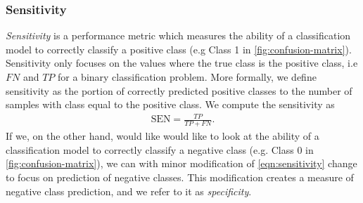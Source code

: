 \subsubsection{Sensitivity}
\label{sec:sensitivity}
\textit{Sensitivity} is a performance metric which measures the ability of a classification model to correctly classify a positive class (e.g Class 1 in \cref{fig:confusion-matrix}). Sensitivity only focuses on the values where the true class is the positive class, i.e $FN$ and $TP$ for a binary classification problem. More formally, we define sensitivity as the portion of correctly predicted positive classes to the number of samples with class equal to the positive class. We compute the sensitivity as
\begin{align}
    \text{SEN} = \frac{TP}{TP + FN}.
    \label{eqn:sensitivity}
\end{align}
If we, on the other hand, would like would like to look at the ability of a classification model to correctly classify a negative class (e.g. Class 0 in \cref{fig:confusion-matrix}), we can with minor modification of \cref{eqn:sensitivity} change to focus on prediction of negative classes. This modification creates a measure of negative class prediction, and we refer to it as \textit{specificity}.